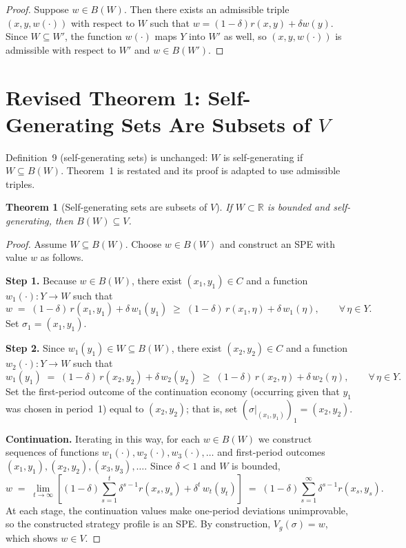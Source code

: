 \documentclass[12pt]{article}
\newtheorem{theorem}{Theorem}
\theoremstyle{definition}
\begin{document}
\begin{proof}
Suppose $w \in B(W)$.  Then there exists an admissible triple $(x, y, w(\cdot))$
with respect to $W$ such that $w = (1-\delta)r(x,y)+\delta w(y)$.
Since $W \subseteq W'$, the function $w(\cdot)$ maps $Y$ into $W'$ as well, so
$(x, y, w(\cdot))$ is admissible with respect to $W'$ and $w \in B(W')$.
\end{proof}

\section{Revised Theorem 1: Self-Generating Sets Are Subsets of $V$}
\label{sec:theorem1}

Definition~9 (self-generating sets) is unchanged: $W$ is self-generating if
$W \subseteq B(W)$.  Theorem~1 is restated and its proof is adapted to use
admissible triples.

\begin{theorem}[Self-generating sets are subsets of $V$]
\label{thm:selfgen}
If $W \subset \mathbb{R}$ is bounded and self-generating, then $B(W) \subseteq V$.
\end{theorem}

\begin{proof}
Assume $W \subseteq B(W)$.  Choose $w \in B(W)$ and construct an SPE with
value $w$ as follows.

\smallskip
\noindent\textbf{Step 1.}
Because $w \in B(W)$, there exist $(x_1, y_1) \in C$ and a function
$w_1(\cdot) : Y \to W$ such that
\[
w
\;=\;
(1-\delta)\,r(x_1, y_1) + \delta\,w_1(y_1)
\;\geq\;
(1-\delta)\,r(x_1,\eta) + \delta\,w_1(\eta),
\qquad \forall\, \eta \in Y.
\]
Set $\sigma_1 = (x_1, y_1)$.

\smallskip
\noindent\textbf{Step 2.}
Since $w_1(y_1) \in W \subseteq B(W)$, there exist $(x_2, y_2) \in C$ and a
function $w_2(\cdot) : Y \to W$ such that
\[
w_1(y_1)
\;=\;
(1-\delta)\,r(x_2, y_2) + \delta\,w_2(y_2)
\;\geq\;
(1-\delta)\,r(x_2,\eta) + \delta\,w_2(\eta),
\qquad \forall\, \eta \in Y.
\]
Set the first-period outcome of the continuation economy (occurring given that
$y_1$ was chosen in period~1) equal to $(x_2, y_2)$; that is, set
$(\sigma|_{(x_1,y_1)})_1 = (x_2, y_2)$.

\smallskip
\noindent\textbf{Continuation.}
Iterating in this way, for each $w \in B(W)$ we construct sequences of
functions $w_1(\cdot), w_2(\cdot), w_3(\cdot), \ldots$ and first-period
outcomes $(x_1, y_1), (x_2, y_2), (x_3, y_3), \ldots$.
Since $\delta < 1$ and $W$ is bounded,
\[
w
\;=\;
\lim_{t\to\infty}
\left[
  (1-\delta)\sum_{s=1}^{t} \delta^{s-1} r(x_s, y_s)
  + \delta^t\, w_t(y_t)
\right]
\;=\;
(1-\delta)\sum_{s=1}^{\infty} \delta^{s-1} r(x_s, y_s).
\]
At each stage, the continuation values make one-period deviations
unimprovable, so the constructed strategy profile is an SPE.  By construction,
$V_g(\sigma) = w$, which shows $w \in V$.
\end{proof}
\end{document}
